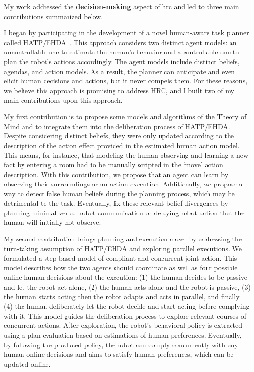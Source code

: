 
My work addressed the \textbf{decision-making} aspect of \acrshort{hrc} and led to three main contributions summarized below.

I began by participating in the development of a novel human-aware task planner called HATP/EHDA~\cite{buisan_hatpehda_icra}. This approach considers two distinct agent models: an uncontrollable one to estimate the human's behavior and a controllable one to plan the robot's actions accordingly. The agent models include distinct beliefs, agendas, and action models. As a result, the planner can anticipate and even elicit human decisions and actions, but it never compels them. For these reasons, we believe this approach is promising to address HRC, and I built two of my main contributions upon this approach.

My first contribution is to propose some models and algorithms of the Theory of Mind and to integrate them into the deliberation process of HATP/EHDA. Despite considering distinct beliefs, they were only updated according to the description of the action effect provided in the estimated human action model. This means, for instance, that modeling the human observing and learning a new fact by entering a room had to be manually scripted in the `move' action description. With this contribution, we propose that an agent can learn by observing their surroundings or an action execution. Additionally, we propose a way to detect false human beliefs during the planning process, which may be detrimental to the task. Eventually, fix these relevant belief divergences by planning minimal verbal robot communication or delaying robot action that the human will initially not observe.

My second contribution brings planning and execution closer by addressing the turn-taking assumption of HATP/EHDA and exploring parallel executions. We formulated a step-based model of compliant and concurrent joint action. This model describes how the two agents should coordinate as well as four possible online human decisions about the execution: (1) the human decides to be passive and let the robot act alone, (2) the human acts alone and the robot is passive, (3) the human starts acting then the robot adapts and acts in parallel, and finally (4) the human deliberately let the robot decide and start acting before complying with it. This model guides the deliberation process to explore relevant courses of concurrent actions. After exploration, the robot's behavioral policy is extracted using a plan evaluation based on estimations of human preferences. Eventually, by following the produced policy, the robot can comply concurrently with any human online decisions and aims to satisfy human preferences, which can be updated online.

